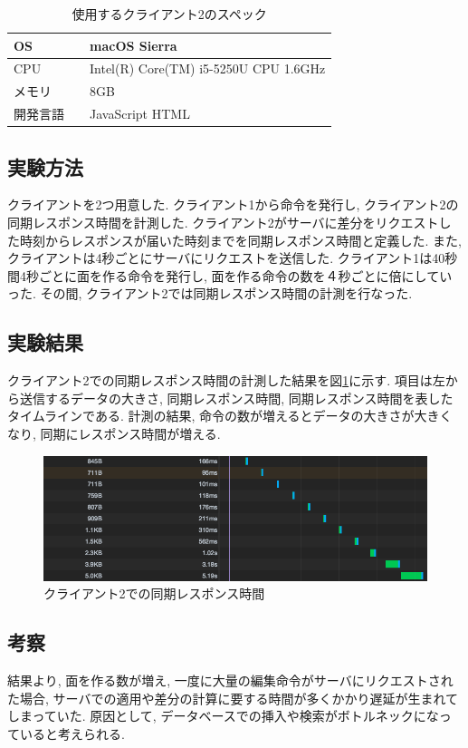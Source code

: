 \begin{table}[htbp]
\begin{center}
	\caption{使用するクライアント2のスペック}
	\begin{tabular}{|l|l|} \hline
		OS & macOS Sierra \\ \hline
		CPU & Intel(R) Core(TM) i5-5250U CPU 1.6GHz \\ \hline
		メモリ & 8GB \\ \hline
    開発言語　& JavaScript HTML \\ \hline
	\end{tabular}
	\label{client2}
\end{center}
\end{table}

\subsection{実験方法}
クライアントを2つ用意した.
クライアント1から命令を発行し, クライアント2の同期レスポンス時間を計測した.
クライアント2がサーバに差分をリクエストした時刻からレスポンスが届いた時刻までを同期レスポンス時間と定義した.
また, クライアントは4秒ごとにサーバにリクエストを送信した.
クライアント1は40秒間4秒ごとに面を作る命令を発行し, 面を作る命令の数を４秒ごとに倍にしていった.
その間, クライアント2では同期レスポンス時間の計測を行なった.
\subsection{実験結果}
クライアント2での同期レスポンス時間の計測した結果を図\ref{jikken3}に示す.
項目は左から送信するデータの大きさ, 同期レスポンス時間, 同期レスポンス時間を表したタイムラインである. 計測の結果, 命令の数が増えるとデータの大きさが大きくなり, 同期にレスポンス時間が増える.
\begin{figure}[htbp]
 \begin{center}
	 \includegraphics[scale=0.5]{images/jikken3}
	 \caption{クライアント2での同期レスポンス時間}
	 \label{jikken3}
 \end{center}
\end{figure}


\subsection{考察}
結果より, 面を作る数が増え, 一度に大量の編集命令がサーバにリクエストされた場合, サーバでの適用や差分の計算に要する時間が多くかかり遅延が生まれてしまっていた.
原因として, データベースでの挿入や検索がボトルネックになっていると考えられる.

